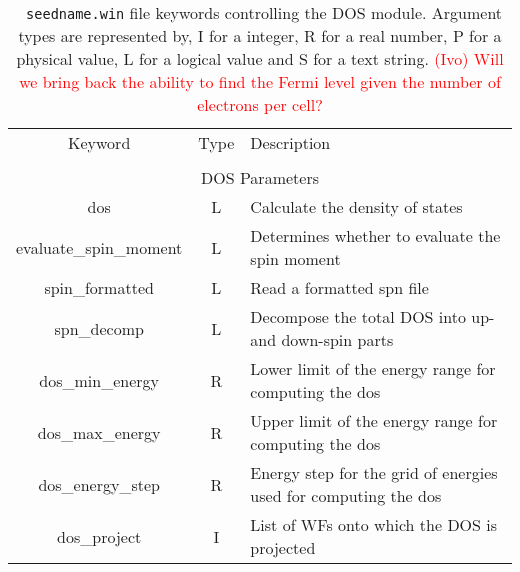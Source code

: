 \begin{table}[hH!]
\begin{center}
\begin{tabular}{|c|c|p{6cm}|}
  \hline
  Keyword & Type & Description \\
  &      &             \\
  \hline\hline
  \multicolumn{3}{|c|}{DOS Parameters} \\
  \hline
  {\sc dos}  & L & Calculate the density of states \\
  {\sc evaluate\_spin\_moment}& L & Determines whether to evaluate the spin moment\\
  {\sc spin\_formatted}& L & Read a formatted spn file\\
  {\sc spn\_decomp}& L & Decompose the total DOS into
  up- and down-spin parts\\
  {\sc dos\_min\_energy} & R & Lower limit of the energy range for
  computing the dos\\
  {\sc dos\_max\_energy}& R & Upper limit of the energy range for
  computing the dos\\
  {\sc dos\_energy\_step}& R & Energy step for the grid of energies
  used for computing the dos\\
  {\sc dos\_project}& I & List of WFs onto which the DOS is projected\\
  \hline
\end{tabular}
\caption[Parameter file keywords controlling the DOS module.]  {{\tt
    seedname.win} file keywords controlling the DOS module. Argument
  types are represented by, I for a integer, R for a real number, P
  for a physical value, L for a logical value and S for a text string.
  \textcolor{red}{(Ivo) Will we bring back the ability to find the
    Fermi level given the number of electrons per cell?}  }
\label{parameter_keywords_dos}
\end{center}
\end{table}


